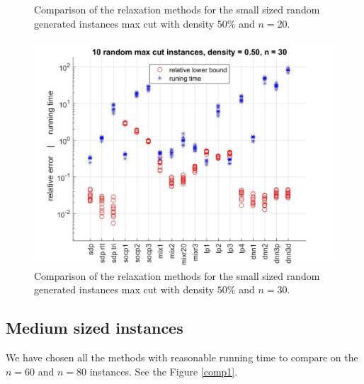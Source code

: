 \documentclass[12pt]{book}
\theoremstyle{definition}
\begin{document}
\begin{center}
\begin{figure}
\caption[Comparison of relaxations - small, dense instances of max cut 1]{Comparison of the relaxation methods for the small sized random generated instances max cut with density $50\%$ and $n=20$.}
\label{comp0_d50_n20}

\includegraphics[scale = 0.27]{img/comp0_d50_n30.jpg}
\caption[Comparison of relaxations - small, dense instances of max cut 2]{Comparison of the relaxation methods for the small sized random generated instances max cut with density $50\%$ and $n=30$.}
\label{comp0_d50_n30}
\end{figure}
\end{center}




\subsection{Medium sized instances}

We have chosen all the methods with reasonable running time to compare on the $n=60$ and $n=80$ instances. See the Figure \ref{comp1}.
\end{document}
